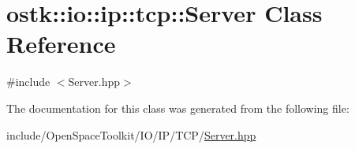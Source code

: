 \hypertarget{classostk_1_1io_1_1ip_1_1tcp_1_1_server}{}\section{ostk\+:\+:io\+:\+:ip\+:\+:tcp\+:\+:Server Class Reference}
\label{classostk_1_1io_1_1ip_1_1tcp_1_1_server}


{\ttfamily \#include $<$Server.\+hpp$>$}



The documentation for this class was generated from the following file\+:\begin{DoxyCompactItemize}
\item 
include/\+Open\+Space\+Toolkit/\+I\+O/\+I\+P/\+T\+C\+P/\hyperlink{_server_8hpp}{Server.\+hpp}\end{DoxyCompactItemize}
